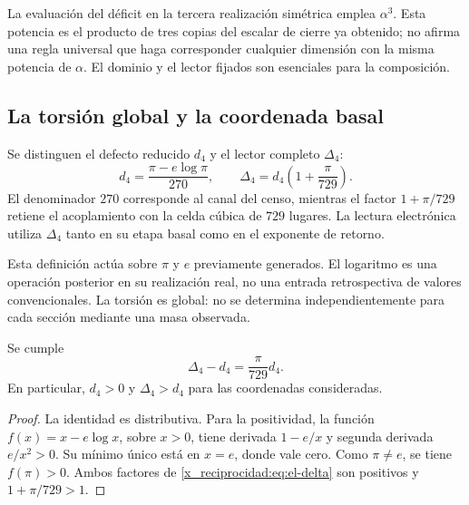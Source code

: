 La evaluación del déficit en la tercera realización simétrica emplea
\(\alpha^3\). Esta potencia es el producto de tres copias del escalar
de cierre ya obtenido; no afirma una regla universal que haga
corresponder cualquier dimensión con la misma potencia de \(\alpha\).
El dominio y el lector fijados son esenciales para la composición.

\subsection{La torsión global y la coordenada basal}

\begin{definition}
Se distinguen el defecto reducido \(d_4\) y el lector completo
\(\Delta_4\):
\begin{equation}
 d_4=\frac{\pi-e\log\pi}{270},\qquad
 \Delta_4=d_4\left(1+\frac{\pi}{729}\right).
 \label{x_reciprocidad:eq:el-delta}
\end{equation}
El denominador \(270\) corresponde al canal del censo, mientras el
factor \(1+\pi/729\) retiene el acoplamiento con la celda cúbica de
\(729\) lugares. La lectura electrónica utiliza \(\Delta_4\) tanto en
su etapa basal como en el exponente de retorno.
\end{definition}

Esta definición actúa sobre \(\pi\) y \(e\) previamente generados. El
logaritmo es una operación posterior en su realización real, no una
entrada retrospectiva de valores convencionales. La torsión es global:
no se determina independientemente para cada sección mediante una masa
observada.

\begin{lemma}
Se cumple
\begin{equation}
 \Delta_4-d_4=\frac{\pi}{729}d_4.
 \label{x_reciprocidad:eq:el-delta-diferencia}
\end{equation}
En particular, \(d_4>0\) y \(\Delta_4>d_4\) para las coordenadas
consideradas.
\end{lemma}
\begin{proof}
La identidad es distributiva. Para la positividad, la función
\(f(x)=x-e\log x\), sobre \(x>0\), tiene derivada \(1-e/x\) y
segunda derivada \(e/x^2>0\). Su mínimo único está en \(x=e\), donde
vale cero. Como \(\pi\ne e\), se tiene \(f(\pi)>0\). Ambos factores
de \eqref{x_reciprocidad:eq:el-delta} son positivos y \(1+\pi/729>1\).
\end{proof}

